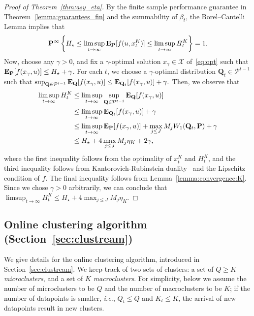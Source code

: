 \documentclass[12pt]{article}
\newcommand{\ie}{{\it i.e.}}
\newcommand{\prob}{{\mathbf P}}
\newcommand{\Expect}{{\mbox{\bf E}}}
\newcommand{\unc}{u}
\begin{document}
\ifpreprint
\begin{proof}[Proof of Theorem~\ref{thm:asy_eta}]
By the finite sample performance guarantee in Theorem~\ref{lemma:guarantees_fin} and the summability of $\beta_t$, the Borel–Cantelli Lemma implies that $$ \mathbf{P}^\infty\left\{ H_\star \leq \limsup_{t \rightarrow \infty } \Expect_\prob[f(\unc,x^K_{t})]\leq  \limsup_{t \rightarrow \infty } H^K_t\right\} = 1.$$
Now, choose any $\gamma >0$, and fix a $\gamma$-optimal solution $x_{\gamma} \in \mathcal{X}$ of~\eqref{eq:opt} such that $\Expect_{\prob}[f(x_{\gamma},u)] \leq H_\star + \gamma$. For each $t$, we choose a $\gamma$-optimal distribution $\mathbf{Q}_t \in \mathcal{P}^{t-1}$ such that $ \sup_{\mathbf{Q} \in \mathcal{P}^{t-1}}\Expect_{\mathbf{Q}}[f(x_{\gamma},u)] \leq \Expect_{\mathbf{Q}_t}[f(x_{\gamma},u)] + \gamma.$
Then, we observe that
\begin{equation*}
\begin{aligned}
    \limsup_{t \rightarrow \infty } H^K_t &\leq \limsup_{t \rightarrow \infty } \sup_{\mathbf{Q} \in \mathcal{P}^{t-1}}\Expect_{\mathbf{Q}}[f(x_{\gamma},u)]\\
    &\leq \limsup_{t \rightarrow \infty }\Expect_{\mathbf{Q}_t}[f(x_{\gamma},u)] + \gamma\\
     &\leq \limsup_{t \rightarrow \infty }\Expect_{\mathbf{\prob}}[f(x_{\gamma},u)] + \max_{j\leq J}M_jW_1(\mathbf{Q}_t,\prob)+ \gamma\\
     &\leq H_\star + 4\max_{j\leq J}M_j\eta_K + 2\gamma,
\end{aligned}
\end{equation*}
where the first inequality follows from the optimality of $x^K_{t}$ and $H^K_t$, and the third inequality follows from Kantorovich-Rubinstein duality~\cite{kantorovich_duality} and the Lipschitz condition of $f$. The final inequality follows from Lemma~\ref{lemma:convergence:K}. Since we chose $\gamma > 0$ arbitrarily, we can conclude that
$\limsup_{t \rightarrow \infty } H^K_t \leq H_\star + 4\max_{j\leq J}M_j\eta_K $.
\end{proof}
\fi


\ifpreprint
\subsection{Online clustering algorithm (Section~\ref{sec:clustream})}
\label{app:onlinecluster}
We give details for the online clustering algorithm, introduced in Section~\ref{sec:clustream}.
We keep track of two sets of clusters: a set of $Q \geq K$ {\it microclusters}, and a set of $K$ {\it macroclusters}. 
For simplicity, below we assume the number of microclusters to be $Q$ and the number of macroclusters to be $K$; if the number of datapoints is smaller, \ie, $Q_t \leq Q$ and $K_t \leq K$, the arrival of new datapoints result in new clusters.
\end{document}
